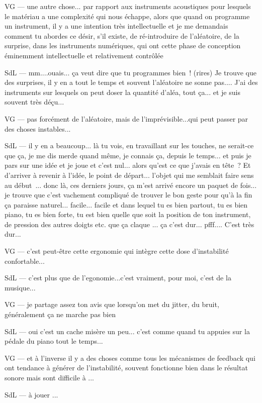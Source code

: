 VG — une autre chose... par rapport aux instruments acoustiques pour lesquels le matériau a une complexité qui nous échappe, alors que quand on programme un instrument, il y a une intention très intellectuelle et je me demandais comment tu abordes ce désir, s'il existe, de ré-introduire de l'aléatoire, de la surprise, dans les instruments numériques, qui ont cette phase de conception éminemment intellectuelle et relativement contrôlée 

SdL — mm....ouais... ça veut dire que tu programmes bien ! (rires) Je trouve que des surprises, il y en a tout le temps et souvent l'aléatoire ne sonne pas.... J'ai des instruments sur lesquels on peut doser la quantité d'aléa, tout ça... et je suis souvent très déçu... 

VG — pas forcément de l'aléatoire, mais de l'imprévisible...qui peut passer par des choses instables... 

SdL — il y en a beaucoup... là tu vois, en travaillant sur les touches, ne serait-ce que ça, je me dis merde quand même, je connais ça, depuis le temps... et puis je pars sur une idée et je joue et c'est nul... alors qu'est ce que j'avais en tête ? Et d'arriver à revenir à l'idée, le point de départ... l'objet qui me semblait faire sens au début ... donc là, ces derniers jours, ça m'est arrivé encore un paquet de fois... je trouve que c'est vachement compliqué de trouver le bon geste pour qu'à la fin ça paraisse naturel... facile... facile et dans lequel tu es bien partout, tu es bien piano, tu es bien forte, tu est bien quelle que soit la position de ton instrument, de pression des autres doigts etc. que ça claque ... ça c'est dur... pfff.... C'est très dur... 

VG — c'est peut-être cette ergonomie qui intègre cette dose d'instabilité confortable... 

SdL — c'est plus que de l'egonomie...c'est vraiment, pour moi, c'est de la musique... 

VG — je partage assez ton avis que lorsqu'on met du jitter, du bruit, généralement ça ne marche pas bien 

SdL — oui c'est un cache misère un peu... c'est comme quand tu appuies sur la pédale du piano tout le temps... 

VG — et à l'inverse il y a des choses comme tous les mécanismes de feedback qui ont tendance à générer de l'instabilité, souvent fonctionne bien dans le résultat sonore mais sont difficile à ... 

SdL — à jouer ... 

